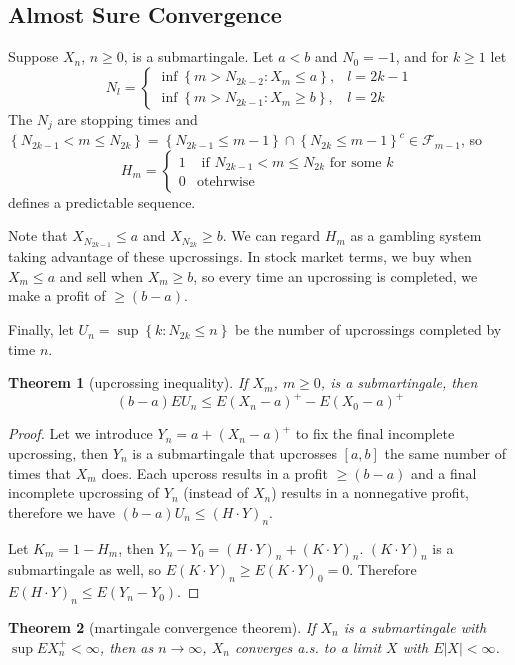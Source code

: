 \documentclass{article}
\newtheorem{Thm}{Theorem}[section]
\theoremstyle{definition}
\begin{document}
\subsection{Almost Sure Convergence}
Suppose $X_n$, $n\ge0$, is a submartingale. Let $a<b$ and $N_0=-1$, and for $k\ge 1$ let \[ N_l=\left\{\begin{matrix}
\inf\left \{ m>N_{2k-2}:X_m\le a \right \},   &l=2k-1\\
\inf\left \{ m>N_{2k-1}:X_m\ge b \right \},&l=2k
\end{matrix}\right.\]
The $N_j$ are stopping times and $\left \{ N_{2k-1}<m\le N_{2k} \right \} =\left \{ N_{2k-1}\le m-1\right \} \cap\left \{ N_{2k}\le m-1 \right \}^c \in\mathcal{F}_{m-1}$, so \[H_m=\left\{\begin{matrix}
 1 & \text{ if }N_{2k-1}<m\le N_{2k} \text{ for some }k\\
 0& \text{otehrwise}
\end{matrix}\right.\]
defines a predictable sequence.\par
Note that $X_{N_{2k-1} }\le a$ and $X_{N_{2k}}\ge b$. We can regard $H_m$ as a gambling system taking advantage of these upcrossings. In stock market terms, we buy when $X_m\le a$ and sell when $X_m\ge b$, so every time an upcrossing is completed, we make a profit of $\ge (b-a)$. \par
Finally, let $U_n=\sup\left\{k:N_{2k}\le n\right\}$ be the number of upcrossings completed by time $n$.
\begin{Thm}[upcrossing inequality]
If $X_m$, $m\ge0$, is a submartingale, then \[(b-a)EU_n\le E(X_n-a)^+-E(X_0-a)^+\]
\end{Thm}
\begin{proof}
Let we introduce $Y_n=a+(X_n-a)^+$ to fix the final incomplete upcrossing, then $Y_n$ is a submartingale that upcrosses $[a,b]$ the same number of times that $X_m$ does. Each upcross results in a profit $\ge(b-a)$ and a final incomplete upcrossing of $Y_n$ (instead of $X_n$) results in a nonnegative profit, therefore we have $(b-a)U_n\le (H\cdot Y)_n$.\par
Let $K_m=1-H_m$, then $Y_n-Y_0=(H\cdot Y)_n+(K\cdot Y)_n$. $(K\cdot Y)_n$ is a submartingale as well, so $E(K\cdot Y)_n\ge E(K\cdot Y)_0=0$. Therefore $E(H\cdot Y)_n\le E(Y_n-Y_0)$.
\end{proof}
\begin{Thm}[martingale convergence theorem]
If $X_n$ is a submartingale with $\sup EX_n^+<\infty$, then as $n\to\infty$, $X_n$ converges a.s. to a limit $X$ with $E\left|X\right|<\infty$.
\end{Thm}
\end{document}

